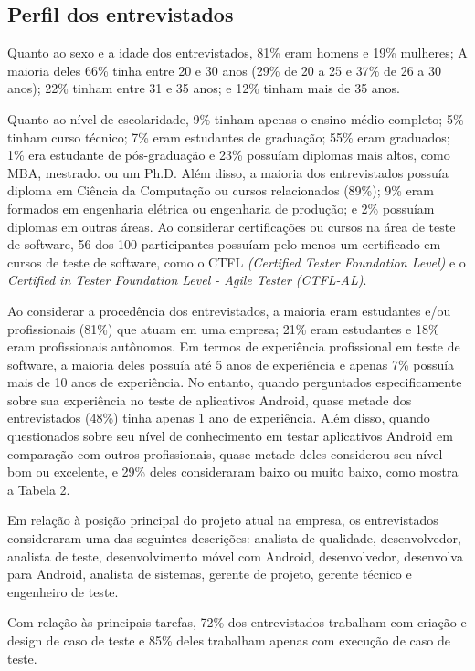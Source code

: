 \subsection{Perfil dos entrevistados}

Quanto ao sexo e a idade dos entrevistados, 81\% eram homens e 19\% mulheres; A maioria deles 66\% tinha entre 20 e 30 anos (29\% de 20 a 25 e 37\% de 26 a 30 anos); 22\% tinham entre 31 e 35 anos; e 12\% tinham mais de 35 anos. 

Quanto ao nível de escolaridade, 9\% tinham apenas o ensino médio completo; 5\% tinham curso técnico; 7\% eram estudantes de graduação; 55\% eram graduados; 1\% era estudante de pós-graduação e 23\% possuíam diplomas mais altos, como MBA, mestrado. ou um Ph.D. Além disso, a maioria dos entrevistados possuía diploma em Ciência da Computação ou cursos relacionados (89\%); 9\% eram formados em engenharia elétrica ou engenharia de produção; e 2\% possuíam diplomas em outras áreas. Ao considerar certificações ou cursos na área de teste de software, 56 dos 100 participantes possuíam pelo menos um certificado em cursos de teste de software, como o CTFL \textit{(Certified Tester Foundation Level)} e o \textit{Certified in Tester Foundation Level - Agile Tester (CTFL-AL)}.

Ao considerar a procedência dos entrevistados, a maioria eram estudantes e/ou profissionais (81\%) que atuam em uma empresa; 21\% eram estudantes e 18\% eram profissionais autônomos. Em termos de experiência profissional em teste de software, a maioria deles possuía até 5 anos de experiência e apenas 7\% possuía mais de 10 anos de experiência. No entanto, quando perguntados especificamente sobre sua experiência no teste de aplicativos Android, quase metade dos entrevistados (48\%) tinha apenas 1 ano de experiência. Além disso, quando questionados sobre seu nível de conhecimento em testar aplicativos Android em comparação com outros profissionais, quase metade deles considerou seu nível bom ou excelente, e 29\% deles consideraram baixo ou muito baixo, como mostra a Tabela 2.
 
Em relação à posição principal do projeto atual na empresa, os entrevistados consideraram uma das seguintes descrições: analista de qualidade, desenvolvedor, analista de teste, desenvolvimento móvel com Android, desenvolvedor, desenvolva para Android, analista de sistemas, gerente de projeto, gerente técnico e engenheiro de teste.
 
Com relação às principais tarefas, 72\% dos entrevistados trabalham com criação e design de caso de teste e 85\% deles trabalham apenas com execução de caso de teste.

